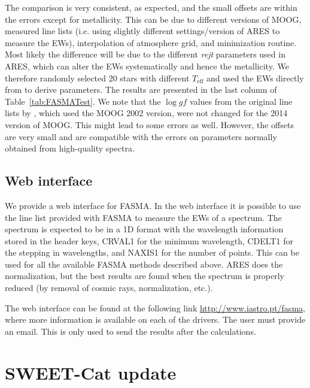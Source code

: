 \documentclass{aa}
\begin{document}
The comparison is very consistent, as expected, and the small offsets are within
the errors except for metallicity. This can be due to different versions of
MOOG, measured line lists (i.e. using slightly different settings/version of
ARES to measure the EWs), interpolation of atmosphere grid, and minimization
routine. Most likely the difference will be due to the different \emph{rejt}
parameters used in ARES, which can alter the EWs systematically and hence the
metallicity. We therefore randomly selected 20 stars with different
$T_\mathrm{eff}$ and used the EWs directly from \citet{Sousa2011} to derive
parameters. The results are presented in the last column of
Table~\ref{tab:FASMATest}. We note that the $\log gf$ values from the original
line lists by \citet{Sousa2011}, which used the MOOG 2002 version, were not
changed for the 2014 version of MOOG. This might lead to some errors as well.
However, the offsets are very small and are compatible with the errors on
parameters normally obtained from high-quality spectra.


\subsection{Web interface}
\label{sub:Web interface}

We provide a web interface for FASMA. In the web interface it is possible to use
the line list provided with FASMA to measure the EWs of a spectrum. The spectrum
is expected to be in a 1D format with the wavelength information stored in the
header keys, CRVAL1 for the minimum wavelength, CDELT1 for the stepping in
wavelengths, and NAXIS1 for the number of points. This can be used for all the
available FASMA methods described above. ARES does the normalization, but the
best results are found when the spectrum is properly reduced (by removal of
cosmic rays, normalization, etc.).

The web interface can be found at the following link
\url{http://www.iastro.pt/fasma}, where more information is available on each of
the drivers. The user must provide an email. This is only used to send the
results after the calculations.


\section{SWEET-Cat update}
\end{document}
